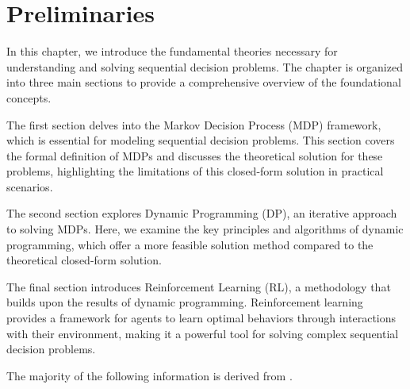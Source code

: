 \chapter{Preliminaries}
\label{ch:Preliminaries}


In this chapter, we introduce the fundamental theories necessary for understanding and solving sequential decision problems.
The chapter is organized into three main sections to provide a comprehensive overview of the foundational concepts.

The first section delves into the Markov Decision Process (MDP) framework, which is essential for modeling sequential 
decision problems. This section covers the formal definition of MDPs and discusses the theoretical solution for 
these problems, highlighting the limitations of this closed-form solution in practical scenarios.

The second section explores Dynamic Programming (DP), an iterative approach to solving MDPs. Here, we examine the 
key principles and algorithms of dynamic programming, which offer a more feasible solution method compared 
to the theoretical closed-form solution.

The final section introduces Reinforcement Learning (RL), a methodology that builds upon the results of dynamic programming. 
Reinforcement learning provides a framework for agents to learn optimal behaviors through interactions with their environment,
making it a powerful tool for solving complex sequential decision problems.

The majority of the following information is derived from \cite{Sutton1998}.




